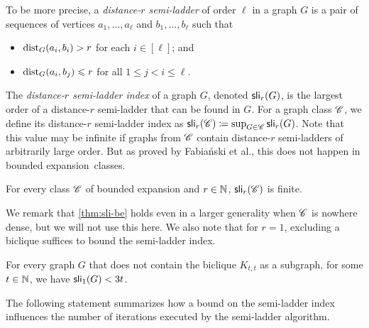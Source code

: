 To be more precise, a \emph{distance-$r$ semi-ladder} of order $\ell$ in a graph $G$ is a pair of sequences of vertices $a_1,\ldots,a_\ell$ and $b_1,\ldots,b_\ell$ such that
\begin{itemize}
	\item $\mathrm{dist}_G(a_i,b_i)>r$ for each $i\in [\ell]$; and
	\item $\mathrm{dist}_G(a_i,b_j)\leqslant r$ for all $1\leq j<i\leq \ell$.
\end{itemize}
The \emph{distance-$r$ semi-ladder index} of a graph $G$, denoted $\mathsf{sli}_r(G)$, is the largest order of a distance-$r$ semi-ladder that can be found in $G$. For a graph class $\mathscr C$, we define its distance-$r$ semi-ladder index as $\mathsf{sli}_r(\mathscr C)\coloneqq \sup_{G\in \mathscr C} \mathsf{sli}_r(G)$. Note that this value may be infinite if graphs from $\mathscr C$ contain distance-$r$ semi-ladders of arbitrarily large order. But as proved by Fabia\'nski et al., this does not happen in bounded expansion~classes.

\begin{theorem}\label{thm:sli-be}
	For every class $\mathscr C$ of bounded expansion and $r\in \mathbb{N}$, $\mathsf{sli}_r(\mathscr C)$ is finite.
\end{theorem}

We remark that \cref{thm:sli-be} holds even in a larger generality when $\mathscr C$ is nowhere dense, but we will not use this here. We also note that for $r=1$, excluding a biclique suffices to bound the semi-ladder index.

\begin{theorem}\label{thm:sli-biclique}
	For every graph $G$ that does not contain the biclique $K_{t,t}$ as a subgraph, for some $t\in \mathbb{N}$, we have $\mathsf{sli}_1(G)<3t$.
\end{theorem}

The following statement summarizes how a bound on the semi-ladder index influences the number of iterations executed by the semi-ladder algorithm.

